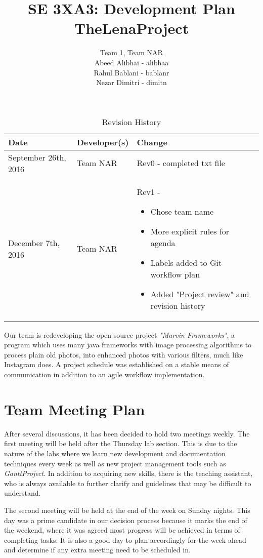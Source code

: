 \documentclass{article}
\title{SE 3XA3: Development Plan \\ TheLenaProject}
\author{Team 1, Team NAR
	\\Abeed Alibhai - alibhaa
	\\Rahul Bablani - bablanr
	\\Nezar Dimitri - dimitn}
\date{}
\begin{document}
\begin{table}[hp]
	\caption{Revision History} \label{TblRevisionHistory}
	\begin{tabularx}{\textwidth}{llX}
		\toprule
		\textbf{Date} & \textbf{Developer(s)} & \textbf{Change}\\
		\midrule
		September 26th, 2016 & Team NAR & Rev0 - completed txt file\\ 
		December 7th, 2016 & Team NAR & Rev1 -
		\begin{itemize}
			\item Chose team name
			\item More explicit rules for agenda 
			\item Labels added to Git workflow plan	
			\item Added "Project review" and revision history
		\end{itemize}
		\\
		\bottomrule
	\end{tabularx}
\end{table}

\newpage

\maketitle


Our team is redeveloping the open source project \textit{"Marvin Frameworks"}, a program which uses many java frameworks with image processing algorithms to process plain old photos, into enhanced photos with various filters, much like Instagram does. A project schedule was established on a stable means of communication in addition to an agile workflow implementation.

\section{Team Meeting Plan}
\indent After several discussions, it has been decided to hold two meetings weekly. The first meeting will be held after the Thursday lab section. This is due to the nature of the labs where we learn new development and documentation techniques every week as well as new project management tools such as \textit{GanttProject}. In addition to acquiring new skills, there is the teaching assistant, who is always available to further clarify and guidelines that may be difficult to understand. 

\index The second meeting will be held at the end of the week on Sunday nights. This day was a prime candidate in our decision process because it marks the end of the weekend, where it was agreed most progress will be achieved in terms of completing tasks. It is also a good day to plan accordingly for the week ahead and determine if any extra meeting need to be scheduled in.
\end{document}
